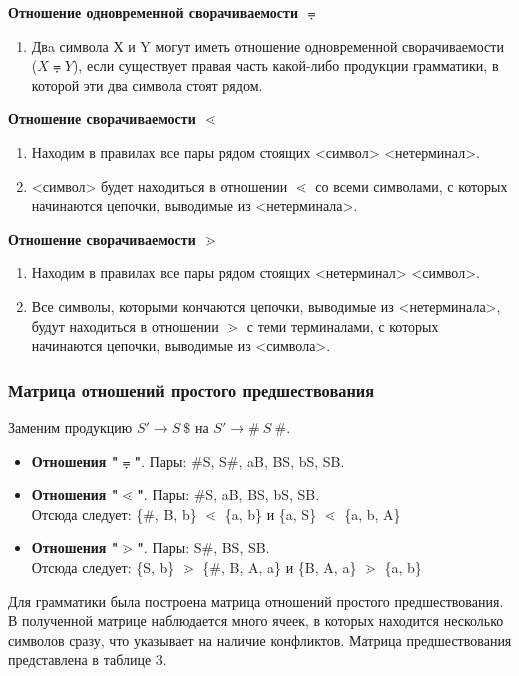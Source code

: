 \documentclass[a4paper,final]{article}
\begin{document}
\textbf{Отношение одновременной сворачиваемости $\eqdot$}
\begin{enumerate}
    \item Двa символа Х и Y могут иметь отношение одновременной сворачиваемости ($X \eqdot Y$), если существует правая часть какой-либо продукции грамматики, в которой эти два символа стоят рядом.
\end{enumerate}

\textbf{Отношение сворачиваемости $\lessdot$}
\begin{enumerate}
    \item Находим в правилах все пары рядом стоящих <символ> <нетерминал>.
    \item <символ> будет находиться в отношении $\lessdot$ со всеми символами, с которых начинаются цепочки, выводимые из <нетерминала>.
\end{enumerate}

\textbf{Отношение сворачиваемости $\gtrdot$}
\begin{enumerate}
    \item Находим в правилах все пары рядом стоящих <нетерминал> <символ>.
    \item Все символы, которыми кончаются цепочки, выводимые из <нетерминала>, будут находиться в отношении $\gtrdot$ с теми терминалами, с которых начинаются цепочки, выводимые из <символа>.
\end{enumerate}

\subsubsection{Матрица отношений простого предшествования}

Заменим продукцию $S' \rightarrow S ~\$$ на $S' \rightarrow \#~S~\#$.

\begin{itemize}
    \item \textbf{Отношения "$\eqdot$"}. Пары: \#S, S\#, aB, BS, bS, SB.
    \item \textbf{Отношения "$\lessdot$"}. Пары: \#S, aB, BS, bS, SB.\\ Отсюда следует: \{\#, B, b\} $\lessdot$ \{a, b\} и \{a, S\} $\lessdot$ \{a, b, A\}
    \item \textbf{Отношения "$\gtrdot$"}. Пары: S\#, BS, SB.\\ Отсюда следует: \{S, b\} $\gtrdot$ \{\#, B, A, a\} и \{B, A, a\} $\gtrdot$ \{a, b\}
\end{itemize}

Для грамматики была построена матрица отношений простого предшествования. В полученной матрице наблюдается много ячеек, в которых находится несколько символов сразу, что указывает на наличие конфликтов. Матрица предшествования представлена в таблице 3.
\end{document}
